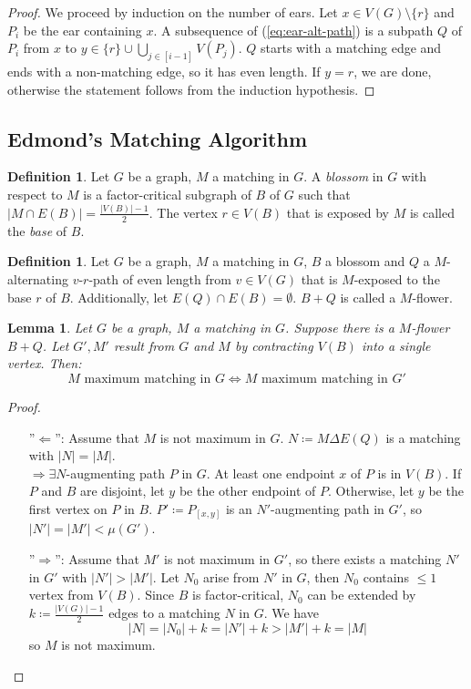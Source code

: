 \documentclass[11pt, a4paper]{article}
\newcommand{\abs}[1]{\left\lvert#1\right\rvert}
\newcommand{\set}[1]{\{#1\}}
\newtheorem{lemma}[theorem]{Lemma}
\theoremstyle{remark}
\theoremstyle{definition}
\newtheorem{definition}[theorem]{Definition}
\begin{document}
\begin{proof}
We proceed by induction on the number of ears. Let $x\in
V(G)\setminus\set{r}$ and $P_i$ be the ear containing $x$.
A subsequence of (\ref{eq:ear-alt-path}) is a subpath $Q$ of $P_i$ from
$x$ to $y\in\set{r}\cup\bigcup_{j\in[i-1]}V(P_j)$. $Q$ starts with a
matching edge and ends with a non-matching edge, so it has even length.
If $y=r$, we are done, otherwise the statement follows from the induction
hypothesis.
\end{proof}

\subsection{Edmond's Matching Algorithm}
\begin{definition}
Let $G$ be a graph, $M$ a matching in $G$. A \emph{blossom} in $G$
with respect to $M$ is a factor-critical subgraph of $B$ of $G$ such that
$\abs{M\cap E(B)}=\frac{\abs{V(B)}-1}{2}$. The vertex $r\in V(B)$ that is
exposed by $M$ is called the \emph{base} of $B$.
\end{definition}

\begin{definition}
Let $G$ be a graph, $M$ a matching in $G$, $B$ a blossom and $Q$ a
$M$-alternating $v$-$r$-path of even length from $v\in V(G)$ that is
$M$-exposed to the base $r$ of $B$. Additionally, let
$E(Q)\cap E(B)=\emptyset$. $B+Q$ is called a $M$-flower.
\end{definition}

\begin{lemma}
Let $G$ be a graph, $M$ a matching in $G$. Suppose there is a $M$-flower
$B+Q$. Let $G',M'$ result from $G$ and $M$ by contracting $V(B)$ into
a single vertex. Then:
\[
	M\text{ maximum matching in $G$} \Leftrightarrow
	M\text{ maximum matching in $G'$}
\]
\end{lemma}
\begin{proof}\ 
\begin{enumerate}
\item[''$\Leftarrow$'':]
Assume that $M$ is not maximum in $G$. $N\coloneqq M\Delta E(Q)$
is a matching with $\abs{N}=\abs{M}$. \\
$\Rightarrow \exists N$-augmenting path $P$ in $G$. At least one endpoint
$x$ of $P$ is in $V(B)$. If $P$ and $B$ are disjoint, let $y$ be the other
endpoint of $P$. Otherwise, let $y$ be the first vertex on $P$ in $B$.
$P'\coloneqq P_{[x,y]}$ is an $N'$-augmenting path in $G'$, so
$\abs{N'}=\abs{M'}<\mu(G')$.

\item[''$\Rightarrow$'':]
Assume that $M'$ is not maximum in $G'$, so there exists a matching $N'$
in $G'$ with $\abs{N'}>\abs{M'}$. Let $N_0$ arise from $N'$ in $G$, then
$N_0$ contains $\leq 1$ vertex from $V(B)$. Since $B$ is factor-critical,
$N_0$ can be extended by $k\coloneqq\frac{\abs{V(G)}-1}{2}$ edges to a
matching $N$ in $G$. We have
\[\abs{N}=\abs{N_0}+k=\abs{N'}+k>\abs{M'}+k=\abs{M}\]
so $M$ is not maximum.
\end{enumerate}
\end{proof}
\end{document}
